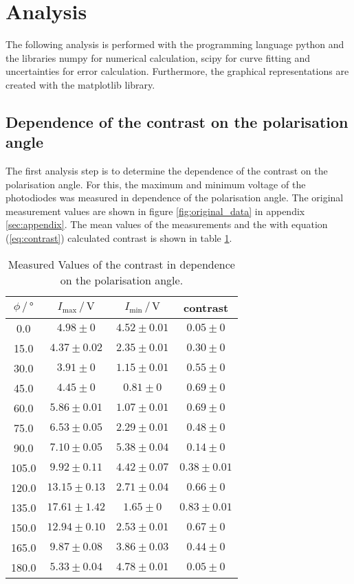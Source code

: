 \section{Analysis}
\label{sec:Analysis}

The following analysis is performed with the programming language python \cite{python} and the libraries numpy \cite{numpy} for numerical calculation, scipy \cite{scipy} for curve fitting and uncertainties \cite{uncertainties} for error calculation.
Furthermore, the graphical representations are created with the matplotlib \cite{matplotlib} library.

\subsection{Dependence of the contrast on the polarisation angle}
\label{subsec:polarisation}

The first analysis step is to determine the dependence of the contrast on the polarisation angle.
For this, the maximum and minimum voltage of the photodiodes was measured in dependence of the polarisation angle.
The original measurement values are shown in figure \ref{fig:original_data} in appendix \ref{sec:appendix}.
The mean values of the measurements and the with equation (\ref{eq:contrast}) calculated contrast is shown in table \ref{tab:values_polarisation}.

\begin{table}[H]
    \centering
    \caption{Measured Values of the contrast in dependence on the polarisation angle.}
    \label{tab:values_polarisation}
    \begin{tabular}{c c c c}
        \toprule
        $\phi \,/\, \si{\degree}$ & $I_{\text{max}}\,/\,\si{\volt}$ & $I_{\text{min}}\,/\,\si{\volt}$ & contrast \\
        \midrule
        0.0 & $4.98\pm0$ & $4.52\pm0.01$ & $0.05\pm0$ \\
        15.0 & $4.37\pm0.02$ & $2.35\pm0.01$ & $0.30\pm0$ \\
        30.0 & $3.91\pm0$ & $1.15\pm0.01$ & $0.55\pm0$ \\
        45.0 & $4.45\pm0$ & $0.81\pm0$ & $0.69\pm0$ \\
        60.0 & $5.86\pm0.01$ & $1.07\pm0.01$ & $0.69\pm0$ \\
        75.0 & $6.53\pm0.05$ & $2.29\pm0.01$ & $0.48\pm0$ \\
        90.0 & $7.10\pm0.05$ & $5.38\pm0.04$ & $0.14\pm0$ \\
        105.0 & $9.92\pm0.11$ & $4.42\pm0.07$ & $0.38\pm0.01$ \\
        120.0 & $13.15\pm0.13$ & $2.71\pm0.04$ & $0.66\pm0$ \\
        135.0 & $17.61\pm1.42$ & $1.65\pm0$ & $0.83\pm0.01$ \\
        150.0 & $12.94\pm0.10$ & $2.53\pm0.01$ & $0.67\pm0$ \\
        165.0 & $9.87\pm0.08$ & $3.86\pm0.03$ & $0.44\pm0$ \\
        180.0 & $5.33\pm0.04$ & $4.78\pm0.01$ & $0.05\pm0$ \\
        \bottomrule
    \end{tabular}
\end{table}

